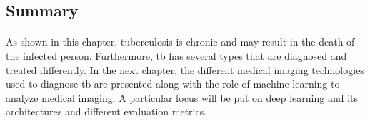 \subsection*{Summary}
\paragraph{}
As shown in this chapter, tuberculosis is chronic and may result in the death of the infected person. Furthermore, \acs{tb} has several types that are diagnosed and treated differently. In the next chapter, the different medical imaging technologies used to diagnose \acs{tb} are presented along with the role of machine learning to analyze medical imaging. A particular focus will be put on deep learning and its architectures and different evaluation metrics.